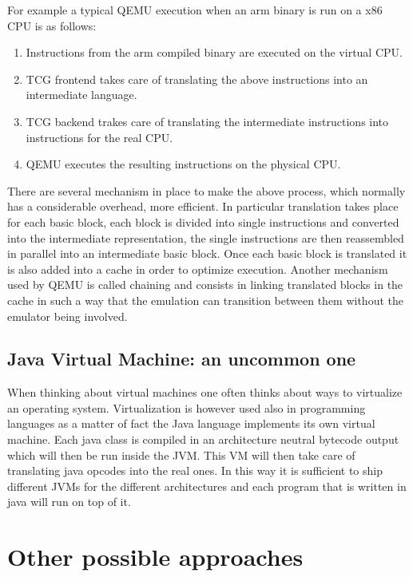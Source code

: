 For example a typical QEMU execution when an arm binary is run on a x86 CPU is as follows: 
\begin{enumerate}
    \item Instructions from the arm compiled binary are executed on the virtual CPU.
    \item TCG frontend takes care of translating the above instructions into an intermediate language. 
    \item TCG backend trakes care of translating the intermediate instructions into instructions for the real CPU. 
    \item QEMU executes the resulting instructions on the physical CPU. 
\end{enumerate}

There are several mechanism in place to make the above process, which normally has a considerable overhead, more efficient. In particular translation takes place for each basic block, each block is divided into single instructions and converted into the intermediate representation, the single instructions are then reassembled in parallel into an intermediate basic block. Once each basic block is translated it is also added into a cache in order to optimize execution. Another mechanism used by QEMU is called chaining and consists in linking translated blocks in the cache in such a way that the emulation can transition between them without the emulator being involved.



\subsection{Java Virtual Machine: an uncommon one}

When thinking about virtual machines one often thinks about ways to virtualize an operating system. Virtualization is however used also in programming languages as a matter of fact the Java language implements its own virtual machine. Each java class is compiled in an architecture neutral bytecode output which will then be run inside the JVM. This VM will then take care of translating java opcodes into the real ones. In this way it is sufficient to ship different JVMs for the different architectures and each program that is written in java will run on top of it.  
\section{Other possible approaches}

